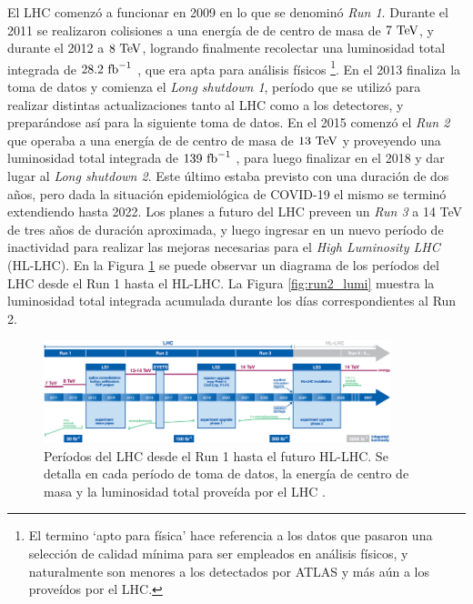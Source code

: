 El LHC comenzó a funcionar en 2009 en lo que se denominó \textit{Run 1}. Durante el 2011 se realizaron colisiones a una energía de de centro de masa de $7\ \text{TeV}$, y durante el 2012 a $8\ \text{TeV}$, logrando finalmente recolectar una luminosidad total integrada de $28.2\ \text{fb}^{-1}$ \cite{DAPR-2011-01,DAPR-2013-01}, que era apta para análisis físicos \footnote{El termino `apto para física' hace referencia a los datos que pasaron una selección de calidad mínima para ser empleados en análisis físicos, y naturalmente son menores a los detectados por ATLAS y más aún a los proveídos por el LHC.}. En el 2013 finaliza la toma de datos y comienza el \textit{Long shutdown 1}, período que se utilizó para realizar distintas actualizaciones tanto al LHC como a los detectores, y preparándose así para la siguiente toma de datos. En el 2015 comenzó el \textit{Run 2} que operaba a una energía de de centro de masa de $13\ \text{TeV}$ y proveyendo una luminosidad total integrada de $139\ \ifb$ \cite{lumi_13tev}, para luego finalizar en el 2018 y dar lugar al \textit{Long shutdown 2}. Este último estaba previsto con una duración de dos años, pero dada la situación epidemiológica de COVID-19 el mismo se terminó extendiendo hasta 2022.
Los planes a futuro del LHC preveen un \textit{Run 3} a 14 TeV de tres años de duración aproximada, y luego ingresar en un nuevo período de inactividad para realizar las mejoras necesarias para el \textit{High Luminosity LHC} (HL-LHC). En la Figura \ref{fig:lhc_periods} se puede observar un diagrama de los períodos del LHC desde el Run 1 hasta el HL-LHC. La Figura \ref{fig:run2_lumi} muestra la luminosidad total integrada acumulada durante los días correspondientes al Run 2.

\begin{figure}
  \centering
  \includegraphics[width=0.9\textwidth]{images/lhc/lhc_periods.png}
  \caption{Períodos del LHC desde el Run 1 hasta el futuro HL-LHC. Se detalla en cada período de toma de datos, la energía de centro de masa y la luminosidad total proveída por el LHC \cite{lhc_periods}.}
  \label{fig:lhc_periods}
\end{figure}

